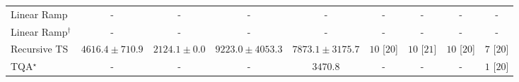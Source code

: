 \begin{tabular}{l|cccc|cccc|}
Linear Ramp & {\cellcolor[HTML]{000000}} \color[HTML]{F1F1F1} {\cellcolor{white}} \color{black} - & {\cellcolor[HTML]{000000}} \color[HTML]{F1F1F1} {\cellcolor{white}} \color{black} - & {\cellcolor[HTML]{000000}} \color[HTML]{F1F1F1} {\cellcolor{white}} \color{black} - & {\cellcolor[HTML]{000000}} \color[HTML]{F1F1F1} {\cellcolor{white}} \color{black} - & {\cellcolor[HTML]{000000}} \color[HTML]{F1F1F1} {\cellcolor{white}} \color{black} - & {\cellcolor[HTML]{000000}} \color[HTML]{F1F1F1} {\cellcolor{white}} \color{black} - & {\cellcolor[HTML]{000000}} \color[HTML]{F1F1F1} {\cellcolor{white}} \color{black} - & {\cellcolor[HTML]{000000}} \color[HTML]{F1F1F1} {\cellcolor{white}} \color{black} - \\
Linear Ramp$^\dagger$ & {\cellcolor[HTML]{000000}} \color[HTML]{F1F1F1} {\cellcolor{white}} \color{black} - & {\cellcolor[HTML]{000000}} \color[HTML]{F1F1F1} {\cellcolor{white}} \color{black} - & {\cellcolor[HTML]{000000}} \color[HTML]{F1F1F1} {\cellcolor{white}} \color{black} - & {\cellcolor[HTML]{000000}} \color[HTML]{F1F1F1} {\cellcolor{white}} \color{black} - & {\cellcolor[HTML]{000000}} \color[HTML]{F1F1F1} {\cellcolor{white}} \color{black} - & {\cellcolor[HTML]{000000}} \color[HTML]{F1F1F1} {\cellcolor{white}} \color{black} - & {\cellcolor[HTML]{000000}} \color[HTML]{F1F1F1} {\cellcolor{white}} \color{black} - & {\cellcolor[HTML]{000000}} \color[HTML]{F1F1F1} {\cellcolor{white}} \color{black} - \\
Recursive TS & {\cellcolor[HTML]{9FBAD9}} \color[HTML]{000000} $4616.4\pm 710.9$ & {\cellcolor[HTML]{F5EEF6}} \color[HTML]{000000} $2124.1\pm 0.0$ & {\cellcolor[HTML]{023A5B}} \color[HTML]{F1F1F1} $9223.0\pm 4053.3$ & {\cellcolor[HTML]{04649E}} \color[HTML]{F1F1F1} $7873.1\pm 3175.7$ & {\cellcolor[HTML]{49006A}} \color[HTML]{F1F1F1} $10$ [$20$] & {\cellcolor[HTML]{49006A}} \color[HTML]{F1F1F1} $10$ [$21$] & {\cellcolor[HTML]{49006A}} \color[HTML]{F1F1F1} $10$ [$20$] & {\cellcolor[HTML]{CD238F}} \color[HTML]{F1F1F1} $7$ [$20$] \\
TQA$^\star$ & {\cellcolor[HTML]{000000}} \color[HTML]{F1F1F1} {\cellcolor{white}} \color{black} - & {\cellcolor[HTML]{000000}} \color[HTML]{F1F1F1} {\cellcolor{white}} \color{black} - & {\cellcolor[HTML]{000000}} \color[HTML]{F1F1F1} {\cellcolor{white}} \color{black} - & {\cellcolor[HTML]{D2D3E7}} \color[HTML]{000000} $3470.8$ & {\cellcolor[HTML]{000000}} \color[HTML]{F1F1F1} {\cellcolor{white}} \color{black} - & {\cellcolor[HTML]{000000}} \color[HTML]{F1F1F1} {\cellcolor{white}} \color{black} - & {\cellcolor[HTML]{000000}} \color[HTML]{F1F1F1} {\cellcolor{white}} \color{black} - & {\cellcolor[HTML]{FFF7F3}} \color[HTML]{000000} $1$ [$20$] \\

\end{tabular}
